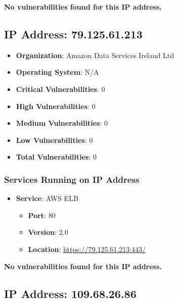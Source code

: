 \documentclass{article}
\begin{document}
\textbf{No vulnerabilities found for this IP address.}




\clearpage



\subsection*{IP Address: 79.125.61.213}

\begin{itemize}
    \item \textbf{Organization}: Amazon Data Services Ireland Ltd
    \item \textbf{Operating System}:  N/A 
    \item \textbf{Critical Vulnerabilities}: 0
    \item \textbf{High Vulnerabilities}: 0
    \item \textbf{Medium Vulnerabilities}: 0
    \item \textbf{Low Vulnerabilities}: 0
    \item \textbf{Total Vulnerabilities}: 0
\end{itemize}

\subsubsection*{Services Running on IP Address}

\begin{itemize}
    
        \item \textbf{Service}: AWS ELB
        \begin{itemize}
            \item \textbf{Port}: 80
            \item \textbf{Version}:  2.0 
            \item \textbf{Location}: \href{ https://79.125.61.213:443/ }{ https://79.125.61.213:443/ }
        \end{itemize}
    
\end{itemize}


\textbf{No vulnerabilities found for this IP address.}




\clearpage



\subsection*{IP Address: 109.68.26.86}
\end{document}
